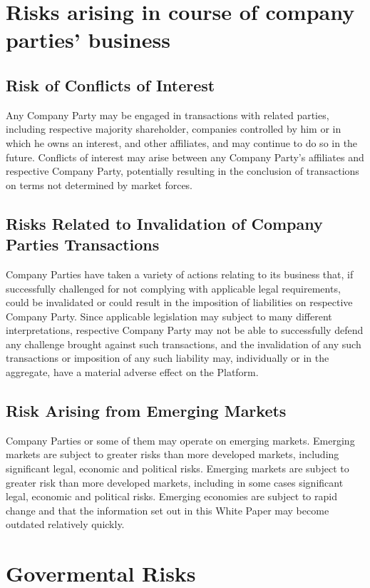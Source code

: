 \documentclass[12pt]{report}
\begin{document}
\begin{multicols}{2}
\section{Risks arising in course of company parties' business}
\subsection{Risk of Conflicts of Interest}
Any Company Party may be engaged in transactions with related parties, including respective majority shareholder, companies controlled by him or in which he owns an interest, and other affiliates, and may continue to do so in the future. Conflicts of interest may arise between any Company Party’s affiliates and respective Company Party, potentially resulting in the conclusion of transactions on terms not determined by market forces.

\subsection{Risks Related to Invalidation of Company Parties Transactions}
Company Parties have taken a variety of actions relating to its business that, if successfully challenged for not complying with applicable legal requirements, could be invalidated or could result in the imposition of liabilities on respective Company Party. Since applicable legislation may subject to many different interpretations, respective Company Party may not be able to successfully defend any challenge brought against such transactions, and the invalidation of any such transactions or imposition of any such liability may, individually or in the aggregate, have a
material adverse effect on the Platform.

\subsection{Risk Arising from Emerging Markets}
Company Parties or some of them may operate on emerging markets. Emerging markets are subject to greater risks than more developed markets, including significant legal, economic and political risks. Emerging markets are subject to greater risk than more developed markets, including in some cases significant legal, economic and political risks. Emerging economies are subject to rapid change and that the information set out in this White Paper may become outdated relatively quickly.

\section{Govermental Risks}

\end{multicols}
\end{document}
